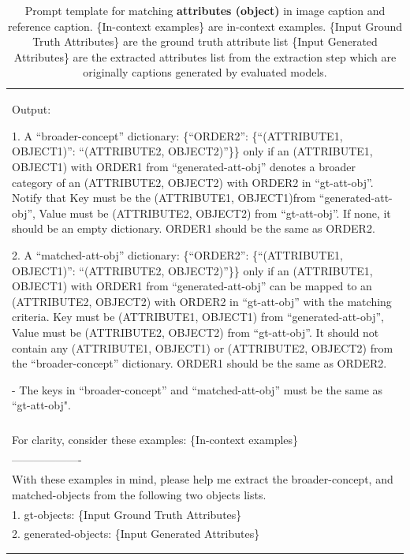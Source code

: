 \begin{table}[h!]
\begin{minipage}{0.95\textwidth}
\begin{tcolorbox}
\begin{tabular}{p{}}
        Output:
        
        1. A ``broader-concept'' dictionary: \{``ORDER2'': \{``(ATTRIBUTE1, OBJECT1)'': ``(ATTRIBUTE2, OBJECT2)''\}\} only if an (ATTRIBUTE1, OBJECT1) with ORDER1 from ``generated-att-obj'' denotes a broader category of an (ATTRIBUTE2, OBJECT2) with ORDER2 in ``gt-att-obj''. Notify that Key must be the (ATTRIBUTE1, OBJECT1)from ``generated-att-obj'', Value must be (ATTRIBUTE2, OBJECT2) from ``gt-att-obj''. If none, it should be an empty dictionary. ORDER1 should be the same as ORDER2.
        
        2. A ``matched-att-obj'' dictionary: \{``ORDER2'': \{``(ATTRIBUTE1, OBJECT1)'': ``(ATTRIBUTE2, OBJECT2)''\}\} only if an (ATTRIBUTE1, OBJECT1) with ORDER1 from ``generated-att-obj'' can be mapped to an (ATTRIBUTE2, OBJECT2) with ORDER2 in ``gt-att-obj'' with the matching criteria. Key must be (ATTRIBUTE1, OBJECT1) from ``generated-att-obj'', Value must be (ATTRIBUTE2, OBJECT2) from ``gt-att-obj''. It should not contain any (ATTRIBUTE1, OBJECT1) or (ATTRIBUTE2, OBJECT2) from the ``broader-concept'' dictionary. ORDER1 should be the same as ORDER2.
        
        - The keys in ``broader-concept'' and ``matched-att-obj'' must be the same as ``gt-att-obj".\\\\
        
        For clarity, consider these examples: \textcolor[rgb]{0,0.7,0}{ \{In-context examples\} } \\
------------------- \\
        With these examples in mind, please help me extract the broader-concept, and matched-objects from the following two objects lists. \\ 
        1. gt-objects: \textcolor[rgb]{0.8,0,0}{\{Input Ground Truth Attributes\}}  \\
        2. generated-objects: \textcolor[rgb]{0.8,0,0}{\{Input Generated Attributes\}} \\\\
\\

    \end{tabular}
\end{tcolorbox}
\caption{Prompt template for matching \textbf{attributes (object)} in image caption and reference caption.
\textcolor[rgb]{0,0.7,0}{ \{In-context examples\} } are in-context examples. \textcolor[rgb]{0.8,0,0}{\{Input Ground Truth Attributes\}} are the ground truth attribute list
\textcolor[rgb]{0.8,0,0}{\{Input Generated Attributes\}} are the extracted attributes list from the extraction step which are originally captions generated by evaluated models.}
    \label{tab:matching_att_obj}
\end{minipage}
\end{table}


